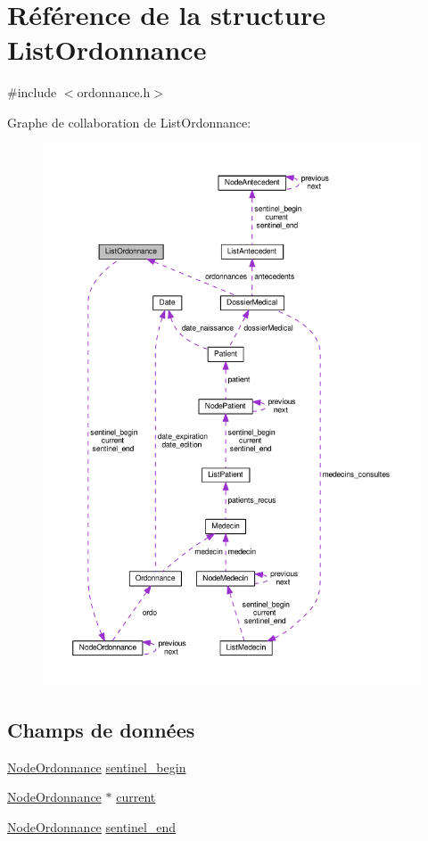 \hypertarget{struct_list_ordonnance}{\section{Référence de la structure List\-Ordonnance}
\label{struct_list_ordonnance}
}


{\ttfamily \#include $<$ordonnance.\-h$>$}



Graphe de collaboration de List\-Ordonnance\-:
\nopagebreak
\begin{figure}[H]
\begin{center}
\leavevmode
\includegraphics[width=350pt]{struct_list_ordonnance__coll__graph}
\end{center}
\end{figure}
\subsection*{Champs de données}
\begin{DoxyCompactItemize}
\item 
\hyperlink{struct_node_ordonnance}{Node\-Ordonnance} \hyperlink{struct_list_ordonnance_a364d17b110f618a202d1e1d49f0d7ca8}{sentinel\-\_\-begin}
\item 
\hyperlink{struct_node_ordonnance}{Node\-Ordonnance} $\ast$ \hyperlink{struct_list_ordonnance_a1cf97af157701a64fc159222fd9b473b}{current}
\item 
\hyperlink{struct_node_ordonnance}{Node\-Ordonnance} \hyperlink{struct_list_ordonnance_a5ca6db7384d3a5276609a826a5576204}{sentinel\-\_\-end}
\end{DoxyCompactItemize}


